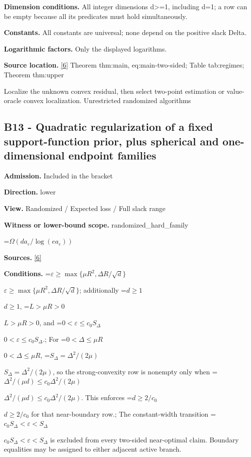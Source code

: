 \documentclass[10pt,a4paper]{article}
\newcommand{\AtlasMath}[1]{\par\begingroup\centering\setbox0=\hbox{$\displaystyle #1$}\ifdim\wd0>1.4\linewidth\typeout{ATLAS WIDE FORMULA: \the\wd0}\fi\ifdim\wd0>\linewidth\resizebox{\linewidth}{!}{\box0}\else\box0\fi\par\endgroup}
\newcommand{\AtlasInlineMath}[1]{\begingroup\setbox0=\hbox{$#1$}\ifdim\wd0>.4\linewidth\endgroup\AtlasMath{#1}\else\endgroup$#1$\fi}
\begin{document}
\textbf{Dimension conditions.} All integer dimensions d>=1, including d=1; a row can be empty because all its predicates must hold simultaneously.



\textbf{Constants.} All constants are universal; none depend on the positive slack Delta.



\textbf{Logarithmic factors.} Only the displayed logarithms.



\textbf{Source location.} \href{https://github.com/WU-Wendao/Colombo/blob/main/colombo_sensorium/Complexity_altas/data/sources/colombo/U10/manuscript.pdf}{[6]} Theorem thm:main, eq:main-two-sided; Table tab:regimes; Theorem thm:upper



Localize the unknown convex residual, then select two-point estimation or value-oracle convex localization. Unrestricted randomized algorithms



\subsection{B13 - Quadratic regularization of a fixed support-function prior, plus spherical and one-dimensional endpoint families}


\textbf{Admission.} Included in the bracket



\textbf{Direction.} lower



\textbf{View.} Randomized / Expected loss / Full slack range



\textbf{Witness or lower-bound scope.} randomized\_hard\_family



\AtlasMath{\Omega(da_\varepsilon/\log(ea_\varepsilon))}


\textbf{Sources.} \href{https://github.com/WU-Wendao/Colombo/blob/main/colombo_sensorium/Complexity_altas/data/sources/colombo/U10/manuscript.pdf}{[6]}



\textbf{Conditions.} \AtlasInlineMath{\varepsilon\ge\max\{\mu R^2,\Delta R/\sqrt d\}}; additionally \AtlasInlineMath{d\ge1}, \AtlasInlineMath{L>\mu R>0}, and \AtlasInlineMath{0<\varepsilon\le c_0S_\Delta}.; For \AtlasInlineMath{0<\Delta\le\mu R}, \AtlasInlineMath{S_\Delta=\Delta^2/(2\mu)}, so the strong-convexity row is nonempty only when \AtlasInlineMath{\Delta^2/(\mu d)\le c_0\Delta^2/(2\mu)}. This enforces \AtlasInlineMath{d\ge2/c_0} for that near-boundary row.; The constant-width transition \AtlasInlineMath{c_0S_\Delta<\varepsilon<S_\Delta} is excluded from every two-sided near-optimal claim. Boundary equalities may be assigned to either adjacent active branch.
\end{document}

